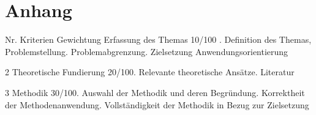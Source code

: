 \documentclass{ffhsthesis}
\begin{document}












\clearpage
\printglossary
\clearpage

\printglossary[type=\acronymtype]


\listoffigures





\newpage


\clearpage
\chapter*{Anhang}

\iffalse
Nr. Kriterien Gewichtung Erfassung des Themas 10/100 . Definition des Themas, Problemstellung. Problemabgrenzung. Zielsetzung Anwendungsorientierung\newline

2 Theoretische Fundierung 20/100. Relevante theoretische Ansätze. Literatur\newline

3 Methodik 30/100. Auswahl der Methodik und deren Begründung. Korrektheit der Methodenanwendung. Vollständigkeit der Methodik in Bezug zur Zielsetzung\newline
\end{document}
